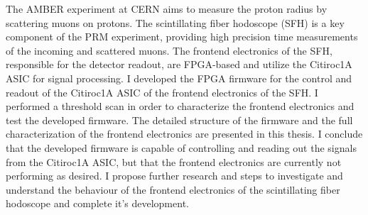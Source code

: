The AMBER experiment at CERN aims to measure the proton radius by scattering muons on protons.
The scintillating fiber hodoscope (SFH) is a key component of the PRM experiment, providing high precision time measurements of the incoming and scattered muons.
The frontend electronics of the SFH, responsible for the detector readout, are FPGA-based and utilize the Citiroc1A ASIC for signal processing.
\newline
I developed the FPGA firmware for the control and readout of the Citiroc1A ASIC of the frontend electronics of the SFH.
\newline
I performed a threshold scan in order to characterize the frontend electronics and test the developed firmware.
\newline
The detailed structure of the firmware and the full characterization of the frontend electronics are presented in this thesis.
\newline
I conclude that the developed firmware is capable of controlling and reading out the signals from the Citiroc1A ASIC,
but that the frontend electronics are currently not performing as desired.
I propose further research and steps to investigate and understand the behaviour of the frontend electronics of the scintillating fiber hodoscope and complete it's development.
